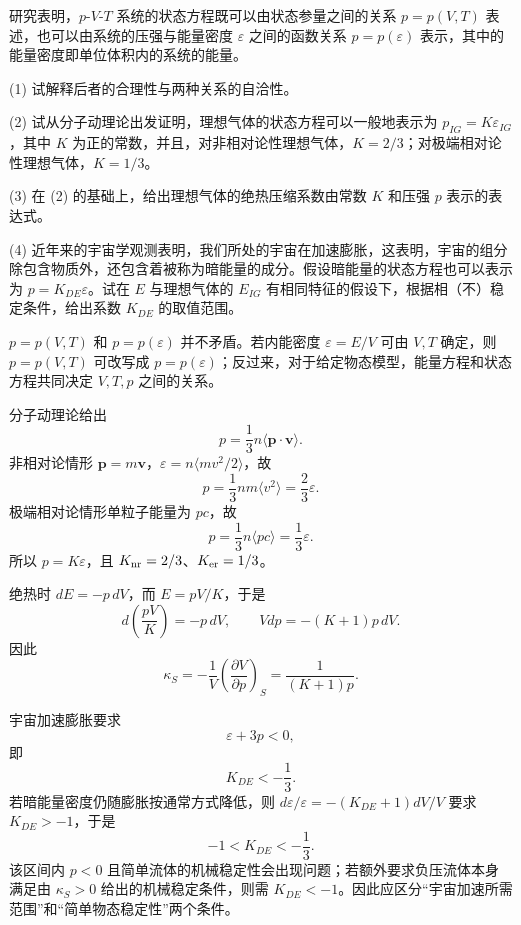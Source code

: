 \begin{question}
研究表明，$p$-$V$-$T$ 系统的状态方程既可以由状态参量之间的关系 $p=p(V,T)$ 表述，也可以由系统的压强与能量密度 $\varepsilon$ 之间的函数关系 $p=p(\varepsilon)$ 表示，其中的能量密度即单位体积内的系统的能量。

(1) 试解释后者的合理性与两种关系的自洽性。

(2) 试从分子动理论出发证明，理想气体的状态方程可以一般地表示为 $p_{IG}=K\varepsilon_{IG}$，其中 $K$ 为正的常数，并且，对非相对论性理想气体，$K=2/3$；对极端相对论性理想气体，$K=1/3$。

(3) 在 (2) 的基础上，给出理想气体的绝热压缩系数由常数 $K$ 和压强 $p$ 表示的表达式。

(4) 近年来的宇宙学观测表明，我们所处的宇宙在加速膨胀，这表明，宇宙的组分除包含物质外，还包含着被称为暗能量的成分。假设暗能量的状态方程也可以表示为 $p=K_{DE}\varepsilon$。试在 $E$ 与理想气体的 $E_{IG}$ 有相同特征的假设下，根据相（不）稳定条件，给出系数 $K_{DE}$ 的取值范围。
\begin{solution}
$p=p(V,T)$ 和 $p=p(\varepsilon)$ 并不矛盾。若内能密度 $\varepsilon=E/V$ 可由 $V,T$ 确定，则 $p=p(V,T)$ 可改写成 $p=p(\varepsilon)$；反过来，对于给定物态模型，能量方程和状态方程共同决定 $V,T,p$ 之间的关系。

分子动理论给出
\[
p=\frac13 n\langle \mathbf p\cdot\mathbf v\rangle.
\]
非相对论情形 $\mathbf p=m\mathbf v$，$\varepsilon=n\langle mv^2/2\rangle$，故
\[
p=\frac13nm\langle v^2\rangle=\frac23\varepsilon.
\]
极端相对论情形单粒子能量为 $pc$，故
\[
p=\frac13 n\langle pc\rangle=\frac13\varepsilon.
\]
所以 $p=K\varepsilon$，且 $K_{\rm nr}=2/3$、$K_{\rm er}=1/3$。

绝热时 $dE=-p\,dV$，而 $E=pV/K$，于是
\[
d\left(\frac{pV}{K}\right)=-p\,dV,
\qquad
Vdp=-(K+1)p\,dV.
\]
因此
\[
\kappa_S=-\frac1V\left(\frac{\partial V}{\partial p}\right)_S
=\frac1{(K+1)p}.
\]

宇宙加速膨胀要求
\[
\varepsilon+3p<0,
\]
即
\[
K_{DE}<-\frac13.
\]
若暗能量密度仍随膨胀按通常方式降低，则 $d\varepsilon/\varepsilon=-(K_{DE}+1)dV/V$ 要求 $K_{DE}>-1$，于是
\[
-1<K_{DE}<-\frac13.
\]
该区间内 $p<0$ 且简单流体的机械稳定性会出现问题；若额外要求负压流体本身满足由 $\kappa_S>0$ 给出的机械稳定条件，则需 $K_{DE}<-1$。因此应区分“宇宙加速所需范围”和“简单物态稳定性”两个条件。

\end{solution}
\end{question}


